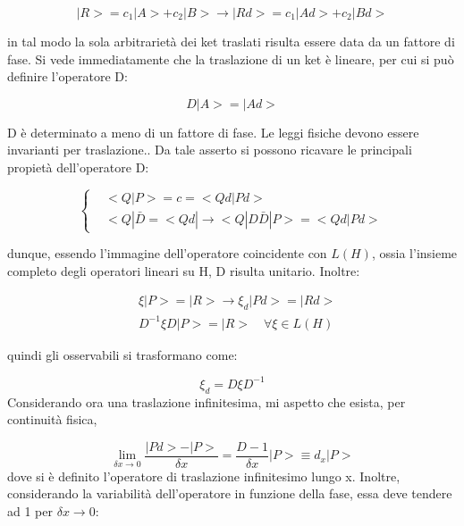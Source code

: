 \documentclass{article}
\begin{document}
\begin{equation}
    |R>=c_1|A>+c_2|B> \rightarrow |Rd>=c_1|Ad>+c_2|Bd>
\end{equation}

in tal modo la sola arbitrarietà dei ket traslati risulta essere data da un fattore di fase.
Si vede immediatamente che la traslazione di un ket è lineare, per cui si può definire l'operatore D:

\begin{equation}
    D|A>=|Ad>
\end{equation}

D è determinato a meno di un fattore di fase.
Le leggi fisiche devono essere invarianti per traslazione..
Da tale asserto si possono ricavare le principali propietà dell'operatore D:

\begin{equation}
    \left\{
    \begin{aligned}
         & <Q |P>=c=<Qd|Pd>                                       \\
         & <Q |\bar{D}= <Qd| \rightarrow <Q |D \bar{D}|P>=<Qd|Pd>
    \end{aligned}
    \right.
\end{equation}

dunque, essendo l'immagine dell'operatore coincidente con $L(H)$, ossia l'insieme completo degli operatori
lineari su H, D risulta unitario.
Inoltre:

\begin{equation}
    \begin{aligned}
         & \xi |P>=|R> \rightarrow \xi_d |Pd>= |Rd>         \\
         & D^{-1}\xi D |P>= |R> \quad \forall  \xi \in L(H)
    \end{aligned}
\end{equation}

quindi gli osservabili si trasformano come:

\begin{equation}
    \xi_d = D \xi D^{-1}
\end{equation}
Considerando ora una traslazione infinitesima, mi aspetto che esista, per continuità fisica,

\begin{equation}
    \lim_{\delta x \rightarrow 0} \frac{|Pd>-|P>}{\delta x}= \frac{D-1}{\delta x}|P>\equiv d_x |P>
\end{equation}
dove si è definito l'operatore di traslazione infinitesimo lungo x.
Inoltre, considerando la variabilità dell'operatore in funzione della fase, essa deve tendere ad 1 per $\delta x \rightarrow 0$:
\end{document}
